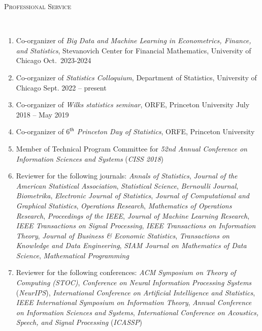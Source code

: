 \documentclass[a4paper, 10pt]{article}
\newenvironment{changemargin}[2]{%
  \begin{list}{}{%
    \setlength{\topsep}{0pt}%
    \setlength{\leftmargin}{#1}%
    \setlength{\rightmargin}{#2}%
    \setlength{\listparindent}{\parindent}%
    \setlength{\itemindent}{\parindent}%
    \setlength{\parsep}{\parskip}%
  }%
  \item[]}{\end{list}
}
\newcommand{\lineover}{
	\begin{changemargin}{-0.05in}{-0.05in}
		\vspace*{-8pt}
		\hrulefill \\
		\vspace*{-2pt}
	\end{changemargin}
}
\newcommand{\header}[1]{
	\begin{changemargin}{-0.5in}{-0.5in}
		\scshape{#1}\\
  	\lineover
	\end{changemargin}
}
\newenvironment{body} {
	\vspace*{-16pt}
	\begin{changemargin}{-0.3in}{-0.5in}
  }	
	{\end{changemargin}
}
\begin{document}
%
\bigskip
\header{\LARGE{Professional Service}}
\begin{body}
	\vspace{18pt}
	\begin{enumerate}
	\item Co-organizer of \emph{Big Data and Machine Learning in Econometrics, Finance, and Statistics}, Stevanovich Center for Financial Mathematics, University of Chicago \hfill Oct.~2023-2024
	\item Co-organizer of \emph{Statistics Colloquium}, Department of Statistics, University of Chicago \hfill Sept. 2022 -- present
	\item Co-organizer of \emph{Wilks statistics seminar}, ORFE, Princeton University \hfill July 2018 -- May 2019
	\item Co-organizer of \emph{$6^{\mathsf{th}}$ Princeton Day of Statistics}, ORFE, Princeton University
	\item Member of Technical Program Committee for \emph{52nd Annual Conference on Information Sciences and Systems} (\emph{CISS 2018})
	\item Reviewer for the following journals: \emph{Annals of Statistics}, \emph{Journal of the American Statistical Association}, \emph{Statistical Science}, \emph{Bernoulli Journal}, \emph{Biometrika}, \emph{Electronic Journal of Statistics}, \emph{Journal of Computational and Graphical Statistics}, \emph{Operations Research}, \emph{Mathematics of Operations Research}, \emph{Proceedings of the IEEE}, \emph{Journal of Machine Learning Research}, \emph{IEEE Transactions on Signal Processing}, \emph{IEEE Transactions on Information Theory}, \emph{Journal of Business \& Economic Statistics}, \emph{Transactions on Knowledge and Data Engineering}, \emph{SIAM Journal on Mathematics of Data Science}, \emph{Mathematical Programming}
	\item Reviewer for the following conferences: \emph{ACM Symposium on Theory of Computing (STOC)}, \emph{Conference on Neural Information Processing Systems} (\emph{NeurIPS}), \emph{International Conference on Artificial Intelligence and Statistics}, \emph{IEEE International Symposium on Information Theory}, \emph{Annual Conference on Information Sciences and Systems}, \emph{International Conference on Acoustics, Speech, and Signal Processing} (\emph{ICASSP})

	\end{enumerate}
\end{body}
\end{document}
